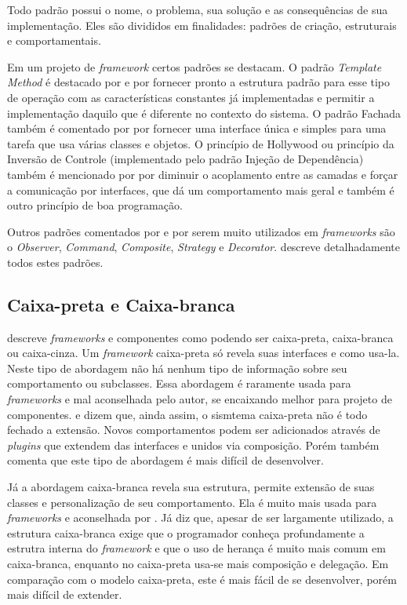 Todo padrão possui o nome, o problema, sua solução e as consequências de sua implementação. Eles são divididos em finalidades: padrões de criação, estruturais e comportamentais.

Em um projeto de \textit{framework} certos padrões se destacam. O padrão \textit{Template Method} é destacado por \cite{Larman2005} e \cite{Fayad1999} por fornecer pronto a estrutura padrão para esse tipo de operação com as características constantes já implementadas e permitir a implementação daquilo que é diferente no contexto do sistema. O padrão Fachada também é comentado por \cite{Larman2005} por fornecer uma interface única e simples para uma tarefa que usa várias classes e objetos. O princípio de Hollywood ou princípio da Inversão de Controle (implementado pelo padrão Injeção de Dependência) também é mencionado por \cite{Larman2005} por diminuir o acoplamento entre as camadas e forçar a comunicação por interfaces, que dá um comportamento mais geral e também é outro princípio de boa programação.

Outros padrões comentados por \cite{Larman2005} e \cite{Szyperski2002} por serem muito utilizados em \textit{frameworks} são o \textit{Observer}, \textit{Command}, \textit{Composite}, \textit{Strategy} e \textit{Decorator}. \cite{Gamma1995} descreve detalhadamente todos estes padrões.

\subsection{Caixa-preta e Caixa-branca}

\cite{Szyperski2002} descreve \textit{frameworks} e componentes como podendo ser caixa-preta, caixa-branca ou caixa-cinza. Um \textit{framework} caixa-preta só revela suas interfaces e como usa-la. Neste tipo de abordagem não há nenhum tipo de informação sobre seu comportamento ou subclasses. Essa abordagem é raramente usada para \textit{frameworks} e mal aconselhada pelo autor, se encaixando melhor para projeto de componentes. \cite{Szyperski2002} e \cite{Fayad1999} dizem que, ainda assim, o sismtema caixa-preta não é todo fechado a extensão. Novos comportamentos podem ser adicionados através de \textit{plugins} que extendem das interfaces e unidos via composição. Porém \cite{Fayad1999} também comenta que este tipo de abordagem é mais difícil de desenvolver.

Já a abordagem caixa-branca revela sua estrutura, permite extensão de suas classes e personalização de seu comportamento. Ela é muito mais usada para \textit{frameworks} e aconselhada por \cite{Szyperski2002}. Já \cite{Fayad1999} diz que, apesar de ser largamente utilizado, a estrutura caixa-branca exige que o programador conheça profundamente a estrutra interna do \textit{framework} e que o uso de herança é muito mais comum em caixa-branca, enquanto no caixa-preta usa-se mais composição e delegação. Em comparação com o modelo caixa-preta, este é mais fácil de se desenvolver, porém mais difícil de extender.

